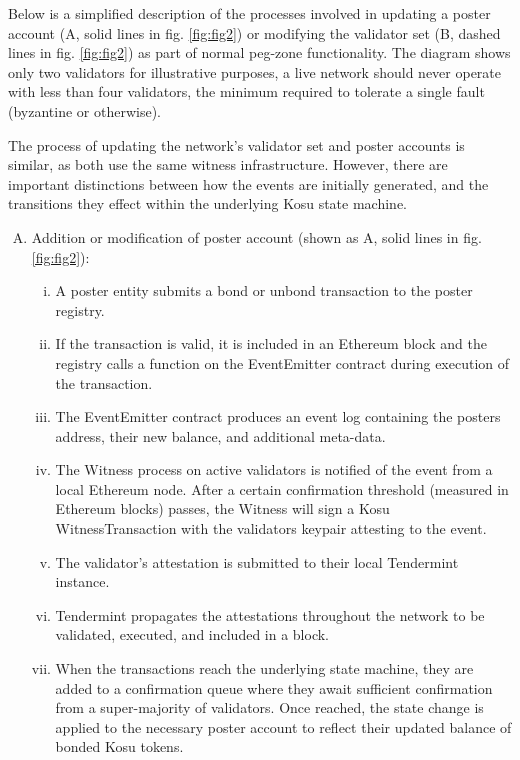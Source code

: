 \documentclass[10pt]{article}
\begin{document}
Below is a simplified description of the processes involved in updating a poster account (A, solid lines in fig. \ref{fig:fig2}) or modifying the validator set (B, dashed lines in fig. \ref{fig:fig2}) as part of normal peg-zone functionality. The diagram shows only two validators for illustrative purposes, a live network should never operate with less than four validators, the minimum required to tolerate a single fault (byzantine or otherwise).
\medskip

The process of updating the network’s validator set and poster accounts is similar, as both use the same witness infrastructure. However, there are important distinctions between how the events are initially generated, and the transitions they effect within the underlying Kosu state machine.

\begin{enumerate}[A.]
  \item Addition or modification of poster account (shown as A, solid lines in fig. \ref{fig:fig2}):
  \begin{enumerate}[i.]
    \item A poster entity submits a bond or unbond transaction to the poster registry.
    \item If the transaction is valid, it is included in an Ethereum block and the registry calls a function on the EventEmitter contract during execution of the transaction.
    \item The EventEmitter contract produces an event log containing the posters address, their new balance, and additional meta-data.
    \item The Witness process on active validators is notified of the event from a local Ethereum node. After a certain confirmation threshold (measured in Ethereum blocks) passes, the Witness will sign a Kosu WitnessTransaction with the validators keypair attesting to the event.
    \item The validator’s attestation is submitted to their local Tendermint instance.
    \item Tendermint propagates the attestations throughout the network to be validated, executed, and included in a block.
    \item When the transactions reach the underlying state machine, they are added to a confirmation queue where they await sufficient confirmation from a super-majority of validators. Once reached, the state change is applied to the necessary poster account to reflect their updated balance of bonded Kosu tokens.
  \end{enumerate}

\end{enumerate}
\end{document}

